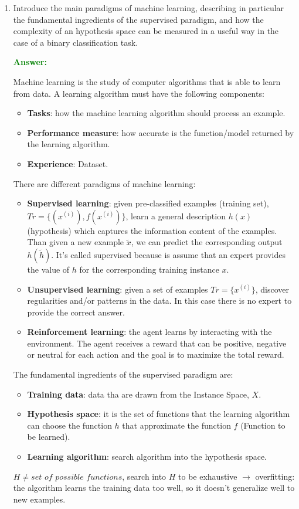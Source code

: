 \documentclass[12pt]{article}
\begin{document}
\begin{enumerate}[label=\textbf{ML.\arabic*}]
    \item Introduce the main paradigms of machine learning, describing in particular the fundamental ingredients of the supervised paradigm, and how the complexity of an hypothesis space can be measured in a useful way in the case of a binary classification task.

    \textcolor{green}{\textbf{Answer:}}

    Machine learning is the study of computer algorithms that is able to learn from data.
    A learning algorithm must have the following components:
    \begin{itemize}
        \item \textbf{Tasks}: how the machine learning algorithm should process an example.
        \item \textbf{Performance measure}: how accurate is the function/model returned by the learning algorithm.
        \item \textbf{Experience}: Dataset.
    \end{itemize}
    There are different paradigms of machine learning:
    \begin{itemize}
        \item \textbf{Supervised learning}\label{q:ml-paradigms}: given pre-classified examples (training set), $Tr = \{(x^{(i)}),f(x^{(i)})\}$, learn a general description $h(x)$ (hypothesis) which captures the information content of the examples.
        Than given a new example $\tilde{x}$, we can predict the corresponding output $h(\tilde{h})$.
        It's called supervised because is assume that an expert provides the value of $h$ for the corresponding training instance $x$. 
        \item \textbf{Unsupervised learning}: given a set of examples $Tr = \{x^{(i)}\}$, discover regularities and/or patterns in the data.
        In this case there is no expert to provide the correct answer.
        \item \textbf{Reinforcement learning}: the agent learns by interacting with the environment.
        The agent receives a reward that can be positive, negative or neutral for each action and the goal is to maximize the total reward.
    \end{itemize}

    The fundamental ingredients of the supervised paradigm are:
    \begin{itemize}
        \item \textbf{Training data}: data tha are drawn from the Instance Space, $X$.
        \item \textbf{Hypothesis space}: it is the set of functions that the learning algorithm 
        can choose the function $h$ that approximate the function $f$ (Function to be learned).
        \item \textbf{Learning algorithm}: search algorithm into the hypothesis space.
    \end{itemize}    
    $H \neq \textit{set of possible functions}$, search into $H$ to be exhaustive $\rightarrow$ overfitting:
    the algorithm learns the training data too well, so it doesn't generalize well to new examples.


\end{enumerate}
\end{document}
